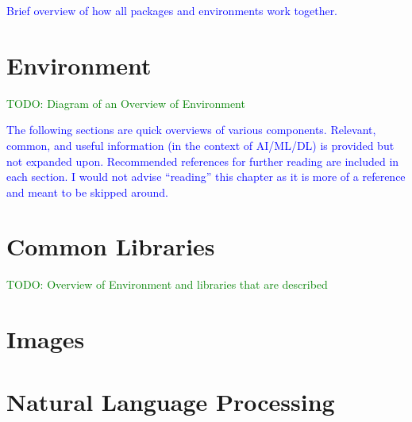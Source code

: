 

\textcolor{blue}{Brief overview of how all packages and environments work together.}

\chapter{Environment}

\textcolor{green}{TODO: Diagram of an Overview of Environment}

\textcolor{blue}{The following sections are quick overviews of various components. Relevant, common, and useful information (in the context of AI/ML/DL) is provided but not expanded upon. Recommended references for further reading are included in each section. I would not advise ``reading'' this chapter as it is more of a reference and meant to be skipped around.}



















\chapter{Common Libraries}

\textcolor{green}{TODO: Overview of Environment and libraries that are described}





\chapter{Images}



\chapter{Natural Language Processing}




